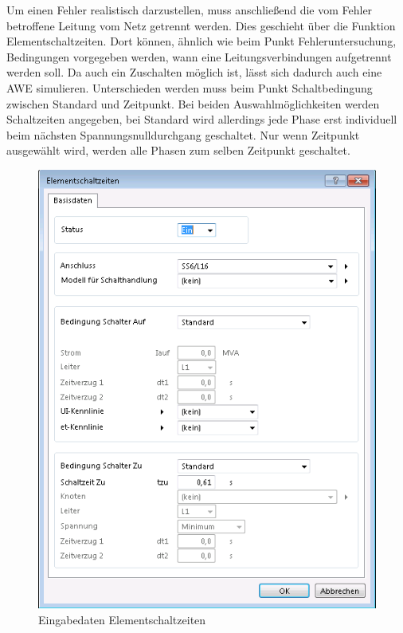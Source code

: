 \documentclass{scrartcl}
\begin{document}
\begin{onehalfspace}
Um einen Fehler realistisch darzustellen, muss anschließend die vom Fehler betroffene Leitung vom Netz getrennt werden. Dies geschieht über die Funktion \glqq Elementschaltzeiten\grqq. Dort können, ähnlich wie beim Punkt Fehleruntersuchung, Bedingungen vorgegeben werden, wann eine Leitungsverbindungen aufgetrennt werden soll. Da auch ein Zuschalten möglich ist, lässt sich dadurch auch eine AWE simulieren. Unterschieden werden muss beim Punkt Schaltbedingung zwischen \glqq Standard\grqq{} und \glqq Zeitpunkt\grqq. Bei beiden Auswahlmöglichkeiten werden Schaltzeiten angegeben, bei \glqq Standard\grqq{} wird allerdings jede Phase erst individuell beim nächsten Spannungsnulldurchgang geschaltet. Nur wenn \glqq Zeitpunkt\grqq{} ausgewählt wird, werden alle Phasen zum selben Zeitpunkt geschaltet.

	\begin{figure}[H]
	\centering
	\includegraphics[scale=0.4]{img/elementschaltzeiten.png}
	\caption{Eingabedaten Elementschaltzeiten}
	\end{figure}
	

\end{onehalfspace}
\end{document}
